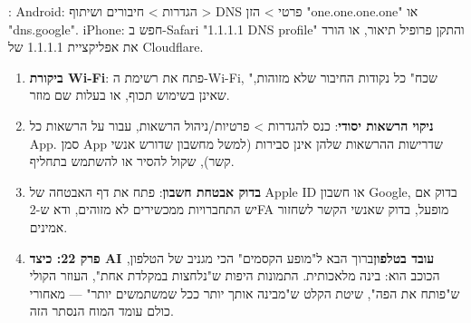 \begin{tcbpractice}{: Android: הגדרות > חיבורים ושיתוף > DNS פרטי > הזן "one.one.one.one" או "dns.google". iPhone: חפש ב-Safari "1.1.1.1 DNS profile" והתקן פרופיל תיאור, או הורד את אפליקציית 1.1.1.1 של Cloudflare.}
\begin{enumerate}
  \item \textbf{ביקורת Wi-Fi}: פתח את רשימת ה-Wi-Fi, "שכח" כל נקודות החיבור שלא מזוהות, שאינן בשימוש תכוף, או בעלות שם מוזר.
  \item \textbf{ניקוי הרשאות יסודי}: כנס להגדרות > פרטיות/ניהול הרשאות, עבור על הרשאות כל App. סמן App שדרישות ההרשאות שלהן אינן סבירות (למשל מחשבון שדורש אנשי קשר), שקול להסיר או להשתמש בתחליף.
  \item \textbf{בדוק אבטחת חשבון}: פתח את דף האבטחה של Apple ID או חשבון Google, בדוק אם יש התחברויות ממכשירים לא מזוהים, ודא ש-2FA מופעל, בדוק שאנשי הקשר לשחזור אמינים.
  \item \textbf{פרק 22: כיצד AI עובד בטלפון}ברוך הבא ל"מופע הקסמים" הכי מגניב של הטלפון, הכוכב הוא: בינה מלאכותית. התמונות היפות ש"נלחצות במקלדת אחת", העוזר הקולי ש"פותח את הפה", שיטת הקלט ש"מבינה אותך יותר ככל שמשתמשים יותר" — מאחורי כולם עומד המוח הנסתר הזה.
\end{enumerate}

\end{tcbpractice}
